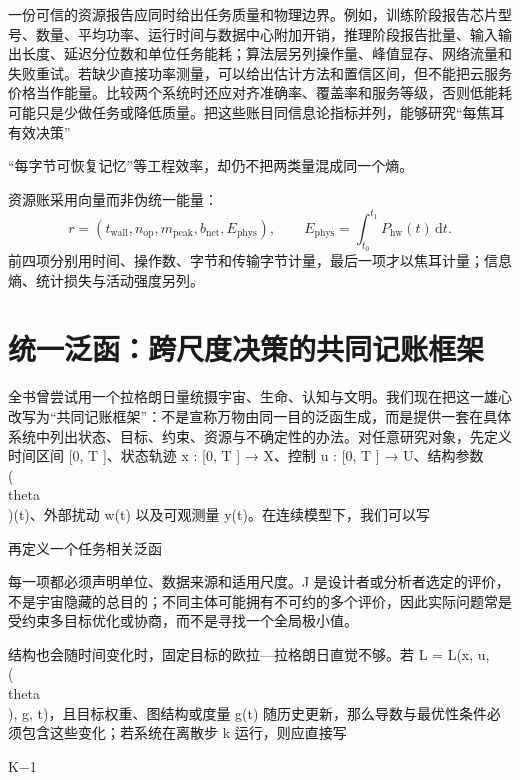 一份可信的资源报告应同时给出任务质量和物理边界。例如，训练阶段报告芯片型号、数量、平均功率、运行时间与数据中心附加开销，推理阶段报告批量、输入输出长度、延迟分位数和单位任务能耗；算法层另列操作量、峰值显存、网络流量和失败重试。若缺少直接功率测量，可以给出估计方法和置信区间，但不能把云服务价格当作能量。比较两个系统时还应对齐准确率、覆盖率和服务等级，否则低能耗可能只是少做任务或降低质量。把这些账目同信息论指标并列，能够研究“每焦耳有效决策”

“每字节可恢复记忆”等工程效率，却仍不把两类量混成同一个熵。

资源账采用向量而非伪统一能量：
\begin{equation}
r=(t_{\mathrm{wall}},n_{\mathrm{op}},m_{\mathrm{peak}},b_{\mathrm{net}},E_{\mathrm{phys}}),\qquad E_{\mathrm{phys}}=\int_{t_0}^{t_1}P_{\mathrm{hw}}(t)\,\mathrm dt.
\end{equation}
前四项分别用时间、操作数、字节和传输字节计量，最后一项才以焦耳计量；信息熵、统计损失与活动强度另列。

\section{统一泛函：跨尺度决策的共同记账框架}

\label{sec:unified_functional_of_everything}

全书曾尝试用一个拉格朗日量统摄宇宙、生命、认知与文明。我们现在把这一雄心改写为“共同记账框架”：不是宣称万物由同一目的泛函生成，而是提供一套在具体系统中列出状态、目标、约束、资源与不确定性的办法。对任意研究对象，先定义时间区间 [0, T ]、状态轨迹 x : [0, T ] → X、控制 u : [0, T ] → U、结构参数 \\(\\theta\\)(t)、外部扰动 w(t) 以及可观测量 y(t)。在连续模型下，我们可以写

再定义一个任务相关泛函

每一项都必须声明单位、数据来源和适用尺度。J 是设计者或分析者选定的评价，不是宇宙隐藏的总目的；不同主体可能拥有不可约的多个评价，因此实际问题常是受约束多目标优化或协商，而不是寻找一个全局极小值。

结构也会随时间变化时，固定目标的欧拉—拉格朗日直觉不够。若 L = L(x, u, \\(\\theta\\), g, t)，且目标权重、图结构或度量 g(t) 随历史更新，那么导数与最优性条件必须包含这些变化；若系统在离散步 k 运行，则应直接写

K−1

